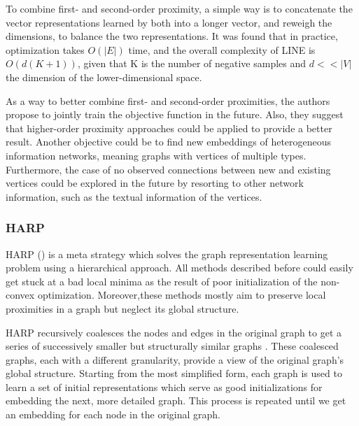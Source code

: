 To combine first- and second-order proximity, a simple way is to concatenate the vector representations learned by both into a longer vector, and reweigh the dimensions, to balance the two representations. It was found that in practice, optimization takes $O(|E|)$ time, and the overall complexity of LINE is $O(d(K+1))$, given that K is the number of negative samples and $d<<|V|$ the dimension of the lower-dimensional space.

As a way to better combine first- and second-order proximities, the authors propose to jointly train the objective function in the future. Also, they suggest that higher-order proximity approaches could be applied to provide a better result. Another objective could be to find new embeddings of heterogeneous information networks, meaning graphs with vertices of multiple types. Furthermore, the case of no observed connections between new and existing vertices could be explored in the future by resorting to other network information, such as the textual information of the vertices.

\subsubsection*{HARP}

HARP (\cite{DBLP:journals/corr/ChenPHS17}) is a meta strategy which solves the graph representation learning problem using a hierarchical approach.
All methods described before could easily get stuck at a bad local minima as the result of poor initialization of the non-convex optimization. Moreover,these methods mostly aim to preserve local proximities in a graph but neglect its global structure.

HARP recursively coalesces the nodes and edges in the original graph to get a series of successively smaller but structurally similar graphs . These coalesced graphs, each with a different granularity, provide a view of the original graph’s global structure. Starting from the most simplified form, each graph is used to learn a set of initial representations which serve as good initializations for embedding the next, more detailed graph. This process is repeated until we get an embedding for each node in the original graph.


